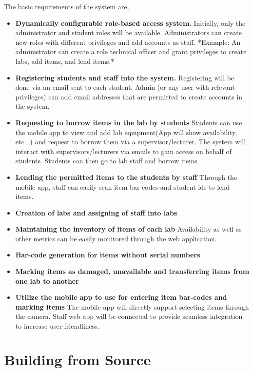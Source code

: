 \documentclass[12pt,a4paper]{article}
\begin{document}
\noindent The basic requirements of the system are,
\begin{itemize}[noitemsep]
    \item  \textbf{Dynamically configurable role-based access system.} Initially, only the administrator and student roles will be available. Administrators can create new roles with different privileges and add accounts as staff. *Example: An administrator can create a role technical officer and grant privileges to create labs, add items, and lend items.*
    \item  \textbf{Registering students and staff into the system.} Registering will be done via an email sent to each student. Admin (or any user with relevant privileges) can add email addresses that are permitted to create accounts in the system.
    \item  \textbf{Requesting to borrow items in the lab by students} Students can use the mobile app to view and add lab equipment(App will show availability, etc...) and request to borrow them via a supervisor/lecturer. The system will interact with supervisors/lecturers via emails to gain access on behalf of students. Students can then go to lab staff and borrow items.
    \item  \textbf{Lending the permitted items to the students by staff} Through the mobile app, staff can easily scan item bar-codes and student ids to lend items.
    \item  \textbf{Creation of labs and assigning of staff into labs}
    \item  \textbf{Maintaining the inventory of items of each lab} Availability as well as other metrics can be easily monitored through the web application.
    \item  \textbf{Bar-code generation for items without serial numbers}
    \item  \textbf{Marking items as damaged, unavailable and transferring items from one lab to another}
    \item  \textbf{Utilize the mobile app to use for entering item bar-codes and marking items} The mobile app will directly support selecting items through the camera. Staff web app will be connected to provide seamless integration to increase user-friendliness.
\end{itemize}\par

\section{Building from Source}
\end{document}
